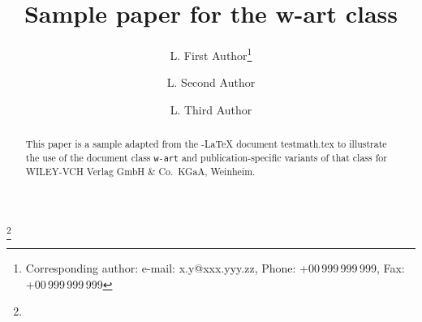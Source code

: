 \documentclass[mlq,fleqn]{w-art}
\begin{document}




\title[Short Title]{Sample paper for the \textbf{w-art} class}


\author[Sh. First Author]{L. First Author\footnote{Corresponding author:
    e-mail: {\sf x.y@xxx.yyy.zz}, Phone: +00\,999\,999\,999, Fax:
    +00\,999\,999\,999}} \address[\inst{1}]{First address}

\author[Sh. Second Author]{L. Second Author}
\address[\inst{2}]{Second address}

\author[Sh. Third Author]{L. Third Author}

\thanks{}

\begin{abstract}
  This paper is a sample adapted from the \AmS-\LaTeX{} document testmath.tex
  to illustrate the use of the document class \texttt{w-art} and
  publication-specific variants of that class for
  WILEY-VCH Verlag GmbH \& Co.~KGaA, Weinheim.
\end{abstract}

\maketitle
\end{document}
